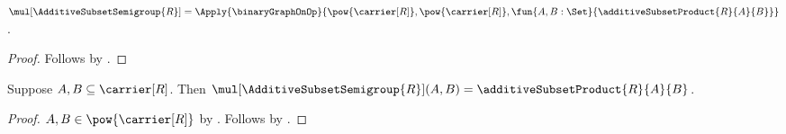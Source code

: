\begin{proposition}\label{additive_subset_semigroup_multiplication}
    $\mul[\AdditiveSubsetSemigroup{R}]
        =\Apply{\binaryGraphOnOp}{
            \pow{\carrier[R]},\pow{\carrier[R]},
            \fun{A,B:\Set}{\additiveSubsetProduct{R}{A}{B}}}$.
\end{proposition}
\begin{proof}
    Follows by
        .
\end{proof}

\begin{proposition}\label{additive_subset_semigroup_mul_apply}
    Suppose $A,B\subseteq\carrier[R]$.
    Then $\mul[\AdditiveSubsetSemigroup{R}](A,B)
        =\additiveSubsetProduct{R}{A}{B}$.
\end{proposition}
\begin{proof}
    $A,B\in\pow{\carrier[R]}$ by .
    Follows by
        .
\end{proof}

